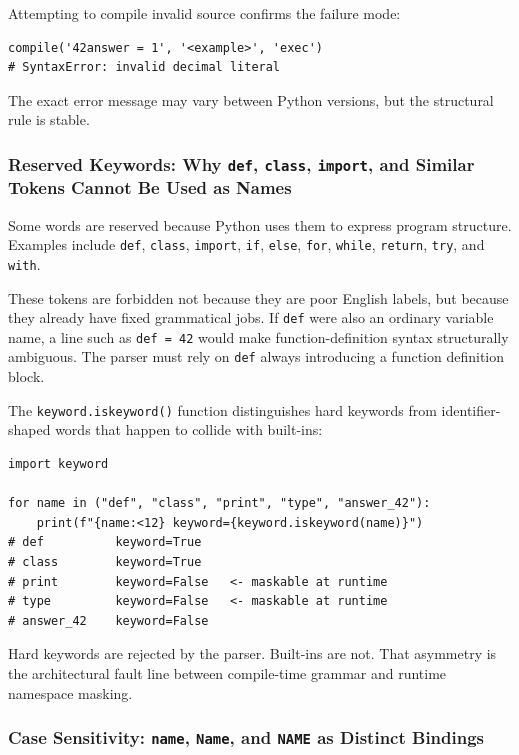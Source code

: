 Attempting to compile invalid source confirms the failure mode:

\begin{verbatim}
compile('42answer = 1', '<example>', 'exec')
# SyntaxError: invalid decimal literal
\end{verbatim}

The exact error message may vary between Python versions, but the structural rule is stable.

\subsubsection{Reserved Keywords: Why \texttt{def}, \texttt{class}, \texttt{import}, and Similar Tokens Cannot Be Used as Names}

Some words are reserved because Python uses them to express program structure. Examples include \texttt{def}, \texttt{class}, \texttt{import}, \texttt{if}, \texttt{else}, \texttt{for}, \texttt{while}, \texttt{return}, \texttt{try}, and \texttt{with}.

These tokens are forbidden not because they are poor English labels, but because they already have fixed grammatical jobs. If \texttt{def} were also an ordinary variable name, a line such as \texttt{def = 42} would make function-definition syntax structurally ambiguous. The parser must rely on \texttt{def} always introducing a function definition block.

The \texttt{keyword.iskeyword()} function distinguishes hard keywords from identifier-shaped words that happen to collide with built-ins:

\begin{verbatim}
import keyword

for name in ("def", "class", "print", "type", "answer_42"):
    print(f"{name:<12} keyword={keyword.iskeyword(name)}")
# def          keyword=True
# class        keyword=True
# print        keyword=False   <- maskable at runtime
# type         keyword=False   <- maskable at runtime
# answer_42    keyword=False
\end{verbatim}

Hard keywords are rejected by the parser. Built-ins are not. That asymmetry is the architectural fault line between compile-time grammar and runtime namespace masking.

\subsubsection{Case Sensitivity: \texttt{name}, \texttt{Name}, and \texttt{NAME} as Distinct Bindings}

